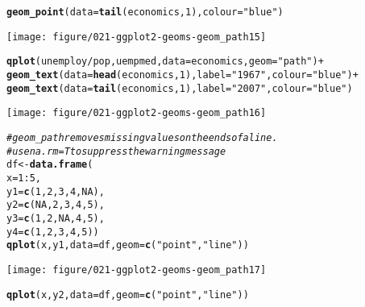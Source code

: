 \documentclass[a4paper,titlepage]{tufte-handout}\usepackage[]{graphicx}\usepackage[]{color}
\makeatletter
\def\maxwidth{ %
  \ifdim\Gin@nat@width>\linewidth
    \linewidth
  \else
    \Gin@nat@width
  \fi
}
\newcommand{\hlnum}[1]{\textcolor[rgb]{0.686,0.059,0.569}{#1}}%
\newcommand{\hlstr}[1]{\textcolor[rgb]{0.192,0.494,0.8}{#1}}%
\newcommand{\hlcom}[1]{\textcolor[rgb]{0.678,0.584,0.686}{\textit{#1}}}%
\newcommand{\hlopt}[1]{\textcolor[rgb]{0,0,0}{#1}}%
\newcommand{\hlstd}[1]{\textcolor[rgb]{0.345,0.345,0.345}{#1}}%
\newcommand{\hlkwb}[1]{\textcolor[rgb]{0.69,0.353,0.396}{#1}}%
\newcommand{\hlkwc}[1]{\textcolor[rgb]{0.333,0.667,0.333}{#1}}%
\newcommand{\hlkwd}[1]{\textcolor[rgb]{0.737,0.353,0.396}{\textbf{#1}}}%
\newenvironment{kframe}{%
 \def\at@end@of@kframe{}%
 \ifinner\ifhmode%
  \def\at@end@of@kframe{\end{minipage}}%
  \begin{minipage}{\columnwidth}%
 \fi\fi%
 \def\FrameCommand##1{\hskip\@totalleftmargin \hskip-\fboxsep
 \colorbox{shadecolor}{##1}\hskip-\fboxsep
     \hskip-\linewidth \hskip-\@totalleftmargin \hskip\columnwidth}%
 \MakeFramed {\advance\hsize-\width
   \@totalleftmargin\z@ \linewidth\hsize
   \@setminipage}}%
 {\par\unskip\endMakeFramed%
 \at@end@of@kframe}
\newenvironment{knitrout}{}{} %
\makeatother
\begin{document}
\begin{knitrout}
\begin{kframe}
\begin{alltt}
  \hlkwd{geom_point}\hlstd{(}\hlkwc{data}\hlstd{=}\hlkwd{tail}\hlstd{(economics,} \hlnum{1}\hlstd{),} \hlkwc{colour}\hlstd{=}\hlstr{"blue"}\hlstd{)}
\end{alltt}
\end{kframe}
\texttt{[image: figure/021-ggplot2-geoms-geom\_path15]} 
\begin{kframe}\begin{alltt}
\hlkwd{qplot}\hlstd{(unemploy}\hlopt{/}\hlstd{pop, uempmed,} \hlkwc{data}\hlstd{=economics,} \hlkwc{geom}\hlstd{=}\hlstr{"path"}\hlstd{)} \hlopt{+}
  \hlkwd{geom_text}\hlstd{(}\hlkwc{data}\hlstd{=}\hlkwd{head}\hlstd{(economics,} \hlnum{1}\hlstd{),} \hlkwc{label}\hlstd{=}\hlstr{"1967"}\hlstd{,} \hlkwc{colour}\hlstd{=}\hlstr{"blue"}\hlstd{)} \hlopt{+}
  \hlkwd{geom_text}\hlstd{(}\hlkwc{data}\hlstd{=}\hlkwd{tail}\hlstd{(economics,} \hlnum{1}\hlstd{),} \hlkwc{label}\hlstd{=}\hlstr{"2007"}\hlstd{,} \hlkwc{colour}\hlstd{=}\hlstr{"blue"}\hlstd{)}
\end{alltt}
\end{kframe}
\texttt{[image: figure/021-ggplot2-geoms-geom\_path16]} 
\begin{kframe}\begin{alltt}
\hlcom{# geom_path removes missing values on the ends of a line.}
\hlcom{# use na.rm = T to suppress the warning message}
\hlstd{df} \hlkwb{<-} \hlkwd{data.frame}\hlstd{(}
  \hlkwc{x} \hlstd{=} \hlnum{1}\hlopt{:}\hlnum{5}\hlstd{,}
  \hlkwc{y1} \hlstd{=} \hlkwd{c}\hlstd{(}\hlnum{1}\hlstd{,} \hlnum{2}\hlstd{,} \hlnum{3}\hlstd{,} \hlnum{4}\hlstd{,} \hlnum{NA}\hlstd{),}
  \hlkwc{y2} \hlstd{=} \hlkwd{c}\hlstd{(}\hlnum{NA}\hlstd{,} \hlnum{2}\hlstd{,} \hlnum{3}\hlstd{,} \hlnum{4}\hlstd{,} \hlnum{5}\hlstd{),}
  \hlkwc{y3} \hlstd{=} \hlkwd{c}\hlstd{(}\hlnum{1}\hlstd{,} \hlnum{2}\hlstd{,} \hlnum{NA}\hlstd{,} \hlnum{4}\hlstd{,} \hlnum{5}\hlstd{),}
  \hlkwc{y4} \hlstd{=} \hlkwd{c}\hlstd{(}\hlnum{1}\hlstd{,} \hlnum{2}\hlstd{,} \hlnum{3}\hlstd{,} \hlnum{4}\hlstd{,} \hlnum{5}\hlstd{))}
\hlkwd{qplot}\hlstd{(x, y1,} \hlkwc{data} \hlstd{= df,} \hlkwc{geom} \hlstd{=} \hlkwd{c}\hlstd{(}\hlstr{"point"}\hlstd{,}\hlstr{"line"}\hlstd{))}
\end{alltt}


{\ttfamily\noindent\color{warningcolor}{\#\# Warning: Removed 1 rows containing missing values (geom\_point).\\\#\# Warning: Removed 1 rows containing missing values (geom\_path).}}\end{kframe}
\texttt{[image: figure/021-ggplot2-geoms-geom\_path17]} 
\begin{kframe}\begin{alltt}
\hlkwd{qplot}\hlstd{(x, y2,} \hlkwc{data} \hlstd{= df,} \hlkwc{geom} \hlstd{=} \hlkwd{c}\hlstd{(}\hlstr{"point"}\hlstd{,}\hlstr{"line"}\hlstd{))}
\end{alltt}



\end{kframe}
\end{knitrout}
\end{document}
